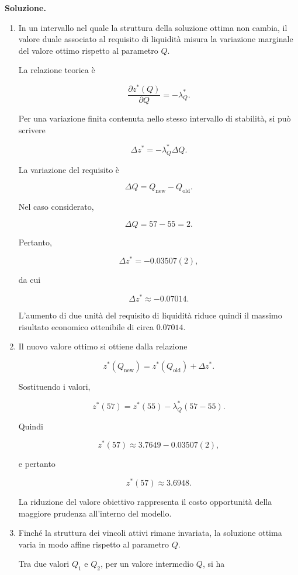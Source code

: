 \noindent
\textbf{Soluzione.}

\begin{enumerate}

\item In un intervallo nel quale la struttura della soluzione ottima non
cambia, il valore duale associato al requisito di liquidit\`a misura la
variazione marginale del valore ottimo rispetto al parametro \(Q\).

La relazione teorica \`e

\[
\frac{\partial z^*(Q)}
{\partial Q}
=
-\lambda_Q^*.
\]

Per una variazione finita contenuta nello stesso intervallo di stabilit\`a,
si pu\`o scrivere

\[
\Delta z^*
=
-\lambda_Q^*\Delta Q.
\]

La variazione del requisito \`e

\[
\Delta Q
=
Q_{\mathrm{new}}-Q_{\mathrm{old}}.
\]

Nel caso considerato,

\[
\Delta Q
=
57-55
=
2.
\]

Pertanto,

\[
\Delta z^*
=
-0.03507(2),
\]

da cui

\[
\Delta z^*
\approx
-0.07014.
\]

L'aumento di due unit\`a del requisito di liquidit\`a riduce quindi il massimo
risultato economico ottenibile di circa \(0.07014\).

\item Il nuovo valore ottimo si ottiene dalla relazione

\[
z^*(Q_{\mathrm{new}})
=
z^*(Q_{\mathrm{old}})
+
\Delta z^*.
\]

Sostituendo i valori,

\[
z^*(57)
=
z^*(55)
-
\lambda_Q^*(57-55).
\]

Quindi

\[
z^*(57)
\approx
3.7649
-
0.03507(2),
\]

e pertanto

\[
z^*(57)
\approx
3.6948.
\]

La riduzione del valore obiettivo rappresenta il costo opportunit\`a della
maggiore prudenza all'interno del modello.

\item Finch\'e la struttura dei vincoli attivi rimane invariata, la soluzione
ottima varia in modo affine rispetto al parametro \(Q\).

Tra due valori \(Q_1\) e \(Q_2\), per un valore intermedio \(Q\), si ha


\end{enumerate}
